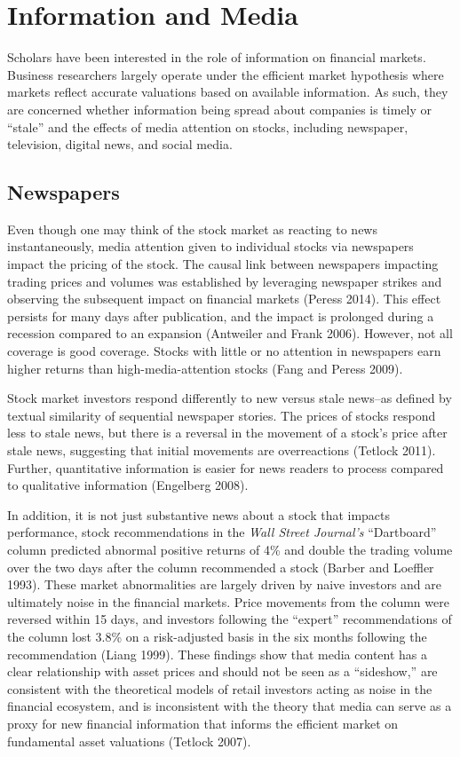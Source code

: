 \documentclass[12pt,]{article}
\begin{document}
\hypertarget{information-and-media}{%
\section{Information and Media}\label{information-and-media}}

Scholars have been interested in the role of information on financial
markets. Business researchers largely operate under the efficient market
hypothesis where markets reflect accurate valuations based on available
information. As such, they are concerned whether information being
spread about companies is timely or ``stale'' and the effects of media
attention on stocks, including newspaper, television, digital news, and
social media.

\hypertarget{newspapers}{%
\subsection{Newspapers}\label{newspapers}}

Even though one may think of the stock market as reacting to news
instantaneously, media attention given to individual stocks via
newspapers impact the pricing of the stock. The causal link between
newspapers impacting trading prices and volumes was established by
leveraging newspaper strikes and observing the subsequent impact on
financial markets (Peress 2014). This effect persists for many days
after publication, and the impact is prolonged during a recession
compared to an expansion (Antweiler and Frank 2006). However, not all
coverage is good coverage. Stocks with little or no attention in
newspapers earn higher returns than high-media-attention stocks (Fang
and Peress 2009).

Stock market investors respond differently to new versus stale news--as
defined by textual similarity of sequential newspaper stories. The
prices of stocks respond less to stale news, but there is a reversal in
the movement of a stock's price after stale news, suggesting that
initial movements are overreactions (Tetlock 2011). Further,
quantitative information is easier for news readers to process compared
to qualitative information (Engelberg 2008).

In addition, it is not just substantive news about a stock that impacts
performance, stock recommendations in the \emph{Wall Street Journal's}
``Dartboard'' column predicted abnormal positive returns of 4\% and
double the trading volume over the two days after the column recommended
a stock (Barber and Loeffler 1993). These market abnormalities are
largely driven by naive investors and are ultimately noise in the
financial markets. Price movements from the column were reversed within
15 days, and investors following the ``expert'' recommendations of the
column lost 3.8\% on a risk-adjusted basis in the six months following
the recommendation (Liang 1999). These findings show that media content
has a clear relationship with asset prices and should not be seen as a
``sideshow,'' are consistent with the theoretical models of retail
investors acting as noise in the financial ecosystem, and is
inconsistent with the theory that media can serve as a proxy for new
financial information that informs the efficient market on fundamental
asset valuations (Tetlock 2007).
\end{document}
